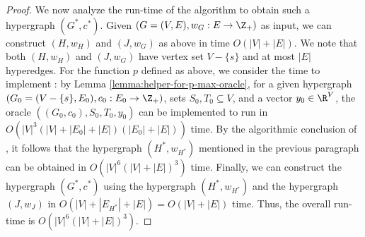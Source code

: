 \begin{proof}
   We now analyze the run-time of the algorithm to obtain such a hypergraph $(G^*, c^*)$. Given $(G=(V, E), w_G: E\rightarrow \Z_+)$ as input, we can construct $(H, w_H)$ and $(J, w_G)$ as above in time $O(|V| + |E|)$. We note that both $(H, w_H)$ and $(J, w_G)$ have vertex set $V-\{s\}$ and at most $|E|$ hyperedges. For the function $p$ defined as above, we consider the time to implement : by Lemma \ref{lemma:helper-for-p-max-oracle}, for a given hypergraph $(G_0=(V-\{s\}, E_0), c_0: E_0\rightarrow \Z_+)$, sets $S_0, T_0\subseteq V$, and a vector $y_0\in \R^V$, the oracle $((G_0, c_0), S_0, T_0, y_0)$ can be implemented to run in $O(|V|^3(|V|+|E_0|+|E|)(|E_0|+|E|))$ time. By the algorithmic conclusion of , it follows that the hypergraph $(H^*, w_{H^*})$ mentioned in the previous paragraph can be obtained in $O(|V|^6(|V|+|E|)^3)$ time. Finally, we can construct the hypergraph $(G^*, c^*)$ using the hypergraph $(H^*, w_{H^*})$ and the hypergraph $(J, w_J)$ in $O(|V|+|E_{H^*}|+|E|)=O(|V|+|E|)$ time. Thus, the overall run-time is $O(|V|^6(|V|+|E|)^3)$.
\end{proof}
